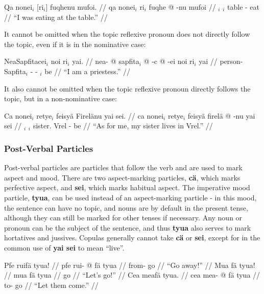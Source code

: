 \documentclass{article}
\begin{document}
\ex[lingstyle=QuCheanya] \begingl
\glpreamble Qa nonei$_i$ [ri$_i$] fuqhenu mufoi. //
\gla qa nonei$_i$ ri$_i$ fuqhe @ -nu mufoi //
\glb {} $_i$ $_i$ table - eat //
\glft ``I was eating at the table.'' //
\endgl \xe

It cannot be omitted when the topic reflexive pronoun does not directly follow the topic, even if it is in the nominative case:

\ex[lingstyle=QuCheanya] \begingl
\glpreamble NeaSapfitacei$_i$ noi ri$_i$ yai. //
\gla nea- @ sapfita$_i$ @ -c @ -ei noi ri$_i$ yai //
\glb person- Sapfita$_i$ - -  $_i$ be //
\glft ``I am a priestess.'' //
\endgl \xe

It also cannot be omitted when the topic reflexive pronoun directly follows the topic, but in a non-nominative case:

\ex[lingstyle=QuCheanya] \begingl
\glpreamble Ca nonei$_i$ retye$_i$ feisy\"a Firel\"anu yai sei. //
\gla ca nonei$_i$ retye$_i$ feisy\"a firel\"a @ -nu yai sei //
\glb {} $_i$ $_i$ sister. Vrel - be  //
\glft ``As for me, my sister lives in Vrel.'' //
\endgl \xe

\subsubsection{Post-Verbal Particles}
\label{postverbalparts}

Post-verbal particles are particles that follow the verb and are used to mark aspect and mood.  There are two aspect-marking particles, \textbf{c\"a}, which marks perfective aspect, and \textbf{sei}, which marks habitual aspect.  The imperative mood particle, \textbf{tyua}, can be used instead of an aspect-marking particle - in this mood, the sentence can have no topic, and nouns are by default in the present tense, although they can still be marked for other tenses if necessary.  Any noun or pronoun can be the subject of the sentence, and thus \textbf{tyua} also serves to mark hortatives and jussives.  Copulas generally cannot take \textbf{c\"a} or \textbf{sei}, except for in the common use of \textbf{yai sei} to mean ``live''.

\pex[lingstyle=QuCheanya] 
\a
\begingl
\glpreamble Pfe ruif\"a tyua! //
\gla pfe rui- @ f\"a tyua //
\glb {} from- go  //
\glft ``Go away!'' //
\endgl
\a
\begingl
\glpreamble Mua f\"a tyua! //
\gla mua f\"a tyua //
\glb {} go  //
\glft ``Let's go!'' //
\endgl
\a
\begingl
\glpreamble Cea meaf\"a tyua. //
\gla cea mea- @ f\"a tyua //
\glb {} to- go  //
\glft ``Let them come.'' //
\endgl
\xe
\end{document}
